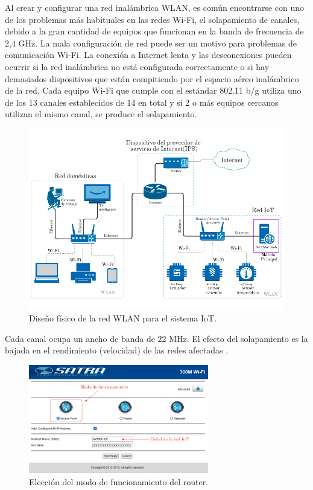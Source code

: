 Al crear y configurar una red inalámbrica WLAN, es común encontrarse con uno de los problemas más habituales en las redes Wi-Fi, el solapamiento de canales, debido a la gran cantidad de equipos que funcionan en la banda de frecuencia de 2,4 GHz. La mala configuración de red puede ser un motivo para problemas de comunicación Wi-Fi. La conexión a Internet lenta y las desconexiones pueden ocurrir si la red inalámbrica no está configurada correctamente o si hay demasiados dispositivos que están compitiendo por el espacio aéreo inalámbrico de la red. Cada equipo Wi-Fi que cumple con el estándar 802.11 b/g utiliza uno de los 13 canales establecidos de 14 en total y si 2 o más equipos cercanos utilizan el mismo canal, se produce el solapamiento. 
\begin{landscape} %
\begin{figure}[htpb]
\centering 
\includegraphics[width=1.3\textwidth]{./Figures/rediot.png}
\caption{Diseño físico de la red WLAN para el sistema IoT.}
\label{fig:diagramared}
\end{figure}
\end{landscape} %

Cada canal ocupa un ancho de banda de 22 MHz. El efecto del solapamiento es la bajada en el rendimiento (velocidad) de las redes afectadas \citep{WEBSITE:26}.

\begin{figure}[htpb]
\centering 
\includegraphics[width=0.7\textwidth]{./Figures/funcionamientorouter.png}
\caption{Elección del modo de funcionamiento del router.}
\label{fig:funcionamientorouter}
\end{figure}

